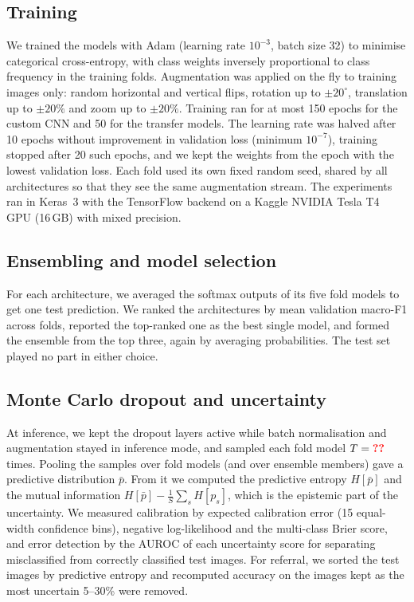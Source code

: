 \documentclass[11pt]{article}
\makeatletter
\newcommand{\res}[2]{\ifcsname res@#1@#2\endcsname\csname res@#1@#2\endcsname\else\textcolor{red}{\textbf{??}}\fi}
\makeatother
\begin{document}
\subsection*{Training}
We trained the models with Adam\cite{kingma2015adam} (learning rate $10^{-3}$, batch size 32) to minimise categorical cross-entropy, with class weights inversely proportional to class frequency in the training folds. Augmentation was applied on the fly to training images only: random horizontal and vertical flips, rotation up to $\pm20^\circ$, translation up to $\pm20\%$ and zoom up to $\pm20\%$. Training ran for at most 150 epochs for the custom CNN and 50 for the transfer models. The learning rate was halved after 10 epochs without improvement in validation loss (minimum $10^{-7}$), training stopped after 20 such epochs, and we kept the weights from the epoch with the lowest validation loss. Each fold used its own fixed random seed, shared by all architectures so that they see the same augmentation stream. The experiments ran in Keras~3 with the TensorFlow backend on a Kaggle NVIDIA Tesla T4 GPU (16\,GB) with mixed precision.

\subsection*{Ensembling and model selection}
For each architecture, we averaged the softmax outputs of its five fold models to get one test prediction. We ranked the architectures by mean validation macro-F1 across folds, reported the top-ranked one as the best single model, and formed the ensemble from the top three, again by averaging probabilities. The test set played no part in either choice.

\subsection*{Monte Carlo dropout and uncertainty}
At inference, we kept the dropout layers active while batch normalisation and augmentation stayed in inference mode, and sampled each fold model $T=\res{data}{mc_samples}$ times\cite{gal2016dropout}. Pooling the samples over fold models (and over ensemble members) gave a predictive distribution $\bar p$. From it we computed the predictive entropy $H[\bar p]$ and the mutual information $H[\bar p] - \frac{1}{S}\sum_s H[p_s]$, which is the epistemic part of the uncertainty\cite{kendall2017}. We measured calibration by expected calibration error (15 equal-width confidence bins)\cite{guo2017calibration}, negative log-likelihood and the multi-class Brier score, and error detection by the AUROC of each uncertainty score for separating misclassified from correctly classified test images. For referral, we sorted the test images by predictive entropy and recomputed accuracy on the images kept as the most uncertain 5--30\% were removed\cite{leibig2017}.
\end{document}
